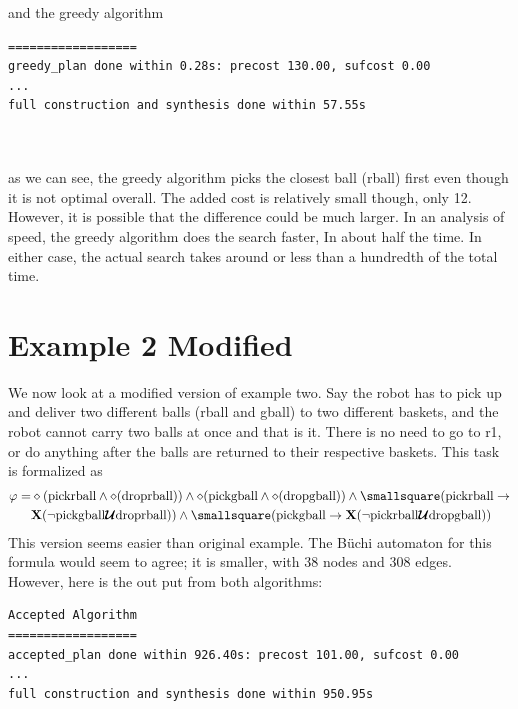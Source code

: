 and the greedy algorithm \\


\begin{minipage}{\textwidth}
\begingroup
\fontsize{9pt}{12pt}\selectfont
\begin{lstlisting}
==================
greedy_plan done within 0.28s: precost 130.00, sufcost 0.00
...
full construction and synthesis done within 57.55s 
\end{lstlisting}
\endgroup
\end{minipage} \\ \\


as we can see, the greedy algorithm picks the closest ball (rball) first even though it is not optimal overall. The added cost is relatively small though, only 12. However, it is possible that the difference could be much larger. In an analysis of speed, the greedy algorithm does the search faster, In about half the time. In either case, the actual search takes around or less than a hundredth of the total time.

\section{Example 2 Modified}
We now look at a modified version of example two. Say the robot has to pick up and deliver two different balls (rball and gball) to two different baskets, and the robot cannot carry two balls at once and that is it. There is no need to go to r1, or do anything after the balls are returned to their respective baskets. This task is formalized as 
\begin{align*}
\varphi = &\diamond (\text{pickrball} \wedge \diamond (\text{droprball})) \wedge \diamond(\text{pickgball} \wedge \diamond (\text{dropgball})) \wedge \smallsquare (\text{pickrball} \rightarrow \\ 
& \textbf{X}(\neg \text{pickgball} \U \text{droprball})) \wedge \smallsquare (\text{pickgball} \rightarrow \textbf{X} (\neg \text{pickrball} \U \text{dropgball}))
\end{align*}
This version seems easier than original example. The B\"uchi automaton for this formula would seem to agree; it is smaller, with 38 nodes and 308 edges. However, here is the out put from both algorithms: \\


\begin{minipage}{\textwidth}
\begingroup
\fontsize{9pt}{12pt}\selectfont
\begin{lstlisting}
Accepted Algorithm
==================
accepted_plan done within 926.40s: precost 101.00, sufcost 0.00
...
full construction and synthesis done within 950.95s 
\end{lstlisting}
\endgroup
\end{minipage} \\ \\



